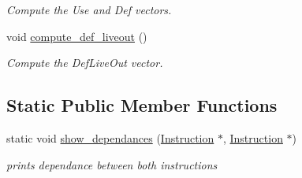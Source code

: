 \begin{DoxyCompactItemize}
\begin{DoxyCompactList}\small\item\em Compute the Use and Def vectors. \end{DoxyCompactList}\item 
\hypertarget{class_basic__block_a11eaa93c186fb46120bb6b0397e0c590}{}void \hyperlink{class_basic__block_a11eaa93c186fb46120bb6b0397e0c590}{compute\+\_\+def\+\_\+liveout} ()\label{class_basic__block_a11eaa93c186fb46120bb6b0397e0c590}

\begin{DoxyCompactList}\small\item\em Compute the Def\+Live\+Out vector. \end{DoxyCompactList}\end{DoxyCompactItemize}
\subsection*{Static Public Member Functions}
\begin{DoxyCompactItemize}
\item 
\hypertarget{class_basic__block_aef985f2438261d429f81c7b5d4de5f16}{}static void \hyperlink{class_basic__block_aef985f2438261d429f81c7b5d4de5f16}{show\+\_\+dependances} (\hyperlink{class_instruction}{Instruction} $\ast$, \hyperlink{class_instruction}{Instruction} $\ast$)\label{class_basic__block_aef985f2438261d429f81c7b5d4de5f16}

\begin{DoxyCompactList}\small\item\em prints dependance between both instructions \end{DoxyCompactList}\end{DoxyCompactItemize}
